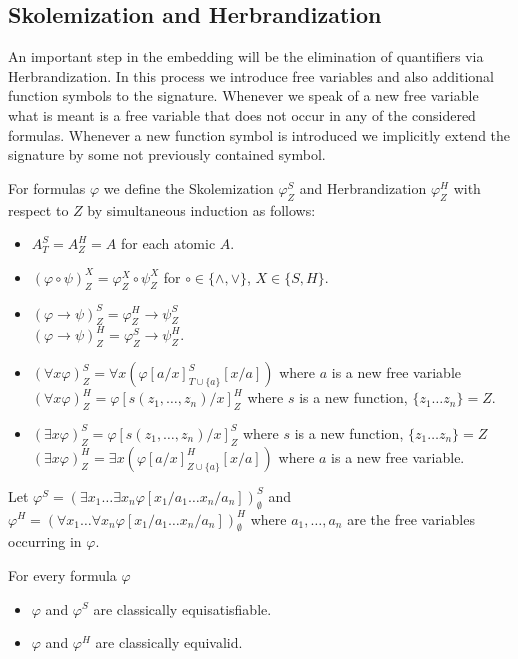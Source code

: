 \documentclass[a4paper,UKenglish,cleveref, autoref, thm-restate]{lipics-v2021}
\begin{document}
\subsection{Skolemization and Herbrandization}
An important step in the embedding will be the elimination of quantifiers via Herbrandization. In this process we introduce free variables and also additional function symbols to the signature. Whenever we speak of a new free variable what is meant is a free variable that does not occur in any of the considered formulas. Whenever a new function symbol is introduced we implicitly extend the signature by some not previously contained symbol.

\begin{definition}
	For formulas $\varphi$ we define the Skolemization $\varphi^S_Z$ and Herbrandization $\varphi^H_Z$ with respect to $Z$ by simultaneous induction as follows:
	\begin{itemize}
		\item $A^S_T = A^H_Z = A$ for each atomic $A$.
		\item $(\varphi\circ\psi)^X_Z = \varphi^X_Z\circ\psi^X_Z$ for $\circ\in\{\wedge, \vee\}$, $X\in\{S, H\}$.
		\item $(\varphi\to\psi)^S_Z = \varphi^H_Z\to \psi^S_Z$\\$(\varphi\to\psi)^H_Z = \varphi^S_Z\to\psi^H_Z$.
		\item $(\forall x\varphi)^S_Z = \forall x(\varphi[a/x]^S_{T\cup\{a\}}[x/a])$ where $a$ is a new free variable\\$(\forall x\varphi)^H_Z = \varphi[s(z_1,\dots,z_n)/x]^H_Z$ where $s$ is a new function, $\{z_1\dots z_n\} = Z$.
		\item $(\exists x\varphi)^S_Z = \varphi[s(z_1,\dots,z_n)/x]^S_Z$ where $s$ is a new function, $\{z_1\dots z_n\} = Z$\\$(\exists x\varphi)^H_Z = \exists x(\varphi[a/x]^H_{Z\cup\{a\}}[x/a])$ where $a$ is a new free variable.
	\end{itemize}
	Let $\varphi^S = (\exists x_1\dots\exists x_n \varphi[x_1/a_1\dots x_n/a_n])^S_\emptyset$ and $\varphi^H = (\forall x_1\dots\forall x_n \varphi[x_1/a_1\dots x_n/a_n])^H_\emptyset$ where $a_1,\dots,a_n$ are the free variables occurring in $\varphi$.
\end{definition}

\begin{theorem}For every formula $\varphi$
	\begin{itemize}
		\item $\varphi$ and $\varphi^S$ are classically equisatisfiable.
		\item $\varphi$ and $\varphi^H$ are classically equivalid.
	\end{itemize}
\end{theorem}
\end{document}

